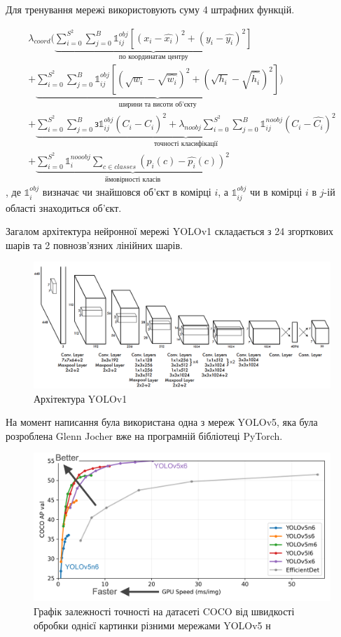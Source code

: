 Для тренування мережі використовують суму 4 штрафних функцій.

\begin{multline}
    \lambda_{coord}(
        \underbrace{ \sum_{i=0}^{S^2} \sum_{j=0}^{B} 
            \mathbb{1}_{ij}^{obj} [(x_i - \widehat{x_i})^2 + (y_i - \widehat{y_i})^2]
        }_\textrm{по координатам центру}\\
        +
        \underbrace{
        \sum_{i=0}^{S^2} \sum_{j=0}^{B} 
                \mathbb{1}_{ij}^{obj} [(\sqrt{w_i} - \sqrt{\widehat{w_i}})^2 + (\sqrt{h_i} - \sqrt{\widehat{h_i}})^2]
        }_\textrm{ширини та висоти об'єкту}
    )\\
    +  \underbrace{
        \sum_{i=0}^{S^2} \sum_{j=0}^{B} з
            \mathbb{1}_{ij}^{obj} (C_i - \widehat{C_i})^2
        +
        \lambda_{noobj} \sum_{i=0}^{S^2} \sum_{j=0}^{B} \mathbb{1}_{ij}^{noobj} (C_i - \widehat{C_i})^2 
        }_\textrm{точності класифікації}\\
    +  \underbrace{
        \sum_{i=0}^{S^2} \mathbb{1}_{i}^{nooobj}\sum_{c \in classes}(p_i(c) -  \widehat{p_i}(c))^2
        }_\textrm{ймовірності класів}
    \label{eq:cnn:yolo_loss}
\end{multline}
, де $\mathbb{1}_{i}^{obj}$ визначає чи знайшовся об'єкт в комірці $i$, а  
$\mathbb{1}_{ij}^{obj}$ чи в комірці $i$ в $j$-ій області знаходиться об'єкт.  

Загалом архітектура нейронної мережі YOLOv1 складається з 24 згорткових шарів та
2 повнозв'язних лінійних шарів.

\begin{figure}[H]
    \includegraphics[width=0.8\linewidth]{images/cnn_yolo2}
    \centering
    \caption{Архітектура YOLOv1 \cite{RedmonYolo}
    }
\end{figure}

На момент написання була використана одна з мереж YOLOv5, яка була
розроблена Glenn Jocher вже на програмній бібліотеці PyTorch.

\begin{figure}[H]
    \includegraphics[width=0.5\linewidth]{images/cnn_yolo3}
    \centering
    \caption{Графік залежності точності на датасеті COCO від швидкості обробки однієї 
    картинки різними мережами YOLOv5 н
    }
\end{figure}

